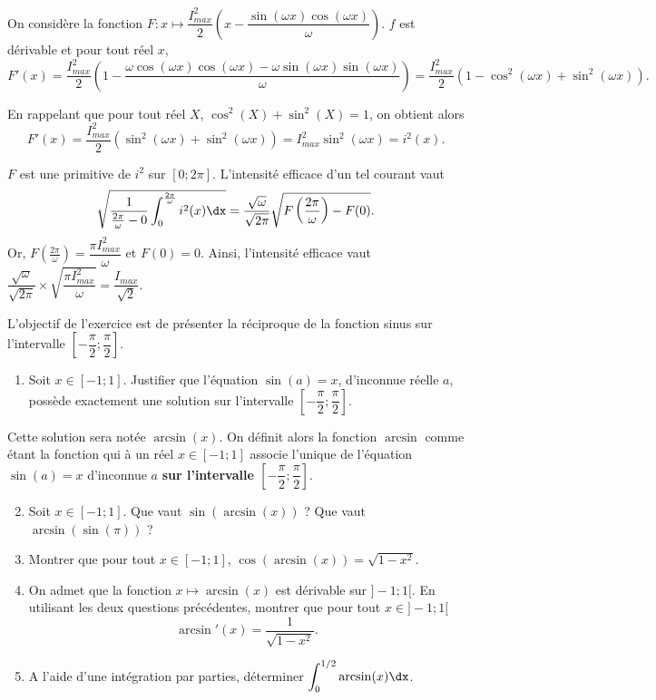 \documentclass[11pt,fleqn, openany]{book} %
\begin{document}
\begin{solution}
On considère la fonction $F:x\mapsto \dfrac{I_{max}^2}{2}\left(x-\dfrac{\sin(\omega x)\cos(\omega x)}{\omega}\right)$. $f$ est dérivable et pour tout réel $x$, 
\[F'(x)=\dfrac{I_{max}^2}{2}\left(1-\dfrac{\omega \cos(\omega x) \cos (\omega x)- \omega \sin( \omega x) \sin (\omega x)}{\omega}\right)=\dfrac{I_{max}^2}{2}\left(1-\cos^2(\omega x)+\sin^2(\omega x)\right).\]

En rappelant que pour tout réel $X$, $\cos^2(X)+\sin^2(X)=1$, on obtient alors
\[ F'(x) = \dfrac{I_{max}^2}{2}(\sin^2(\omega x)+\sin^2(\omega x))=I_{max}^2\sin^2(\omega x)=i^2(x).\]

$F$ est une primitive de $i^2$ sur $[0;2\pi]$. L'intensité efficace d'un tel courant vaut
\[ \sqrt{ \dfrac{1}{\frac{2\pi}{\omega}-0}\int_{0}^{\frac{2\pi}{\omega}} i^2(x)\dx} = \dfrac{\sqrt{\omega}}{\sqrt{2\pi}}\sqrt{F\left(\frac{2\pi}{\omega}\right)-F(0)}.\]
Or, $F\left(\frac{2\pi}{\omega}\right)=\dfrac{\pi I_{max}^2}{\omega}$ et $F(0)=0$. Ainsi, l'intensité efficace vaut $\dfrac{\sqrt{\omega}}{\sqrt {2\pi}} \times \sqrt{\dfrac{\pi I_{max}^2}{\omega}}=\dfrac{I_{max}}{\sqrt{2}}$.
 \end{solution}
 
 

\begin{exercise}[subtitle={(Fonction arcsinus)}]

L'objectif de l'exercice est de présenter la réciproque de la fonction sinus sur l'intervalle $\left[-\dfrac{\pi}{2};\dfrac{\pi}{2}\right]$.

\begin{enumerate}
\item Soit $x\in [-1;1]$. Justifier que l'équation $\sin(a)=x$, d'inconnue réelle $a$, possède exactement une solution sur l'intervalle $\left[-\dfrac{\pi}{2};\dfrac{\pi}{2}\right]$. 
\end{enumerate}
Cette solution sera notée $\arcsin (x)$. On définit alors la fonction $\arcsin$ comme étant la fonction qui à un réel $x\in[-1;1]$ associe l'unique de l'équation $\sin(a)=x$ d'inconnue $a$ \textbf{sur l'intervalle $\left[-\dfrac{\pi}{2};\dfrac{\pi}{2}\right]$}.
\vskip10pt
\begin{enumerate}
\setcounter{enumi}{1}
\item Soit $x\in [-1;1]$. Que vaut $\sin(\arcsin(x))$ ? Que vaut $\arcsin(\sin(\pi))$ ?
\vskip10pt
\item Montrer que pour tout $x\in[-1;1]$, $\cos(\arcsin(x))=\sqrt{1-x^2}$.
\vskip10pt
\item On admet que la fonction $x\mapsto \arcsin (x)$ est dérivable sur $]-1;1[$. En utilisant les deux questions précédentes, montrer que pour tout $x\in ]-1;1[$
\[\arcsin'(x)=\dfrac{1}{\sqrt{1-x^2}}.\]
\item A l'aide d'une intégration par parties, déterminer $\displaystyle\int_0^{1/2} \arcsin(x) \dx$.
\end{enumerate}
\end{exercise}
\end{document}

